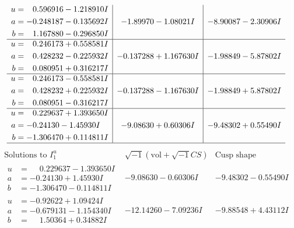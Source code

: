 \documentclass[1p]{elsarticle_modified}
\theoremstyle{definition}
\newcommand{\I}{\sqrt{-1}}
\begin{document}
$$\begin{array}{c|c|c}
\begin{aligned}
u &= \phantom{-}0.596916 - 1.218910 I \\
a &= -0.248187 - 0.135692 I \\
b &= \phantom{-}1.167880 - 0.296850 I\end{aligned}
 & -1.89970 - 1.08021 I & -8.90087 - 2.30906 I \\ \hline\begin{aligned}
u &= \phantom{-}0.246173 + 0.558581 I \\
a &= \phantom{-}0.428232 - 0.225932 I \\
b &= \phantom{-}0.080951 + 0.316217 I\end{aligned}
 & -0.137288 + 1.167630 I & -1.98849 - 5.87802 I \\ \hline\begin{aligned}
u &= \phantom{-}0.246173 - 0.558581 I \\
a &= \phantom{-}0.428232 + 0.225932 I \\
b &= \phantom{-}0.080951 - 0.316217 I\end{aligned}
 & -0.137288 - 1.167630 I & -1.98849 + 5.87802 I \\ \hline\begin{aligned}
u &= \phantom{-}0.229637 + 1.393650 I \\
a &= -0.24130 - 1.45930 I \\
b &= -1.306470 + 0.114811 I\end{aligned}
 & -9.08630 + 0.60306 I & -9.48302 + 0.55490 I\\
 \hline 
 \end{array}$$\newpage$$\begin{array}{c|c|c}  
\text{Solutions to }I^u_{1}& \I (\text{vol} + \sqrt{-1}CS) & \text{Cusp shape}\\
 \hline 
\begin{aligned}
u &= \phantom{-}0.229637 - 1.393650 I \\
a &= -0.24130 + 1.45930 I \\
b &= -1.306470 - 0.114811 I\end{aligned}
 & -9.08630 - 0.60306 I & -9.48302 - 0.55490 I \\ \hline\begin{aligned}
u &= -0.92622 + 1.09424 I \\
a &= -0.679131 - 1.154340 I \\
b &= \phantom{-}1.50364 + 0.34882 I\end{aligned}
 & -12.14260 - 7.09236 I & -9.88548 + 4.43112 I \\ \hline\begin{aligned}

\end{aligned}
\end{array}$$
\end{document}
